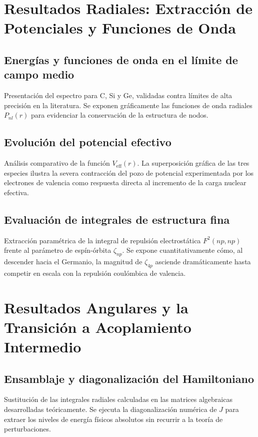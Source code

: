 \documentclass[12pt,a4paper]{book}
\begin{document}
\section{Resultados Radiales: Extracción de Potenciales y Funciones de Onda}

\subsection{Energías y funciones de onda en el límite de campo medio}
Presentación del espectro para C, Si y Ge, validadas contra límites de alta precisión en la literatura. Se exponen gráficamente las funciones de onda radiales $P_{nl}(r)$ para evidenciar la conservación de la estructura de nodos.

\subsection{Evolución del potencial efectivo}
Análisis comparativo de la función $V_{\text{eff}}(r)$. La superposición gráfica de las tres especies ilustra la severa contracción del pozo de potencial experimentada por los electrones de valencia como respuesta directa al incremento de la carga nuclear efectiva.

\subsection{Evaluación de integrales de estructura fina}
Extracción paramétrica de la integral de repulsión electrostática $F^2(np, np)$ frente al parámetro de espín-órbita $\zeta_{np}$. Se expone cuantitativamente cómo, al descender hacia el Germanio, la magnitud de $\zeta_{4p}$ asciende dramáticamente hasta competir en escala con la repulsión coulómbica de valencia.

\section{Resultados Angulares y la Transición a Acoplamiento Intermedio}

\subsection{Ensamblaje y diagonalización del Hamiltoniano}
Sustitución de las integrales radiales calculadas en las matrices algebraicas desarrolladas teóricamente. Se ejecuta la diagonalización numérica de $J$ para extraer los niveles de energía físicos absolutos sin recurrir a la teoría de perturbaciones.
\end{document}
